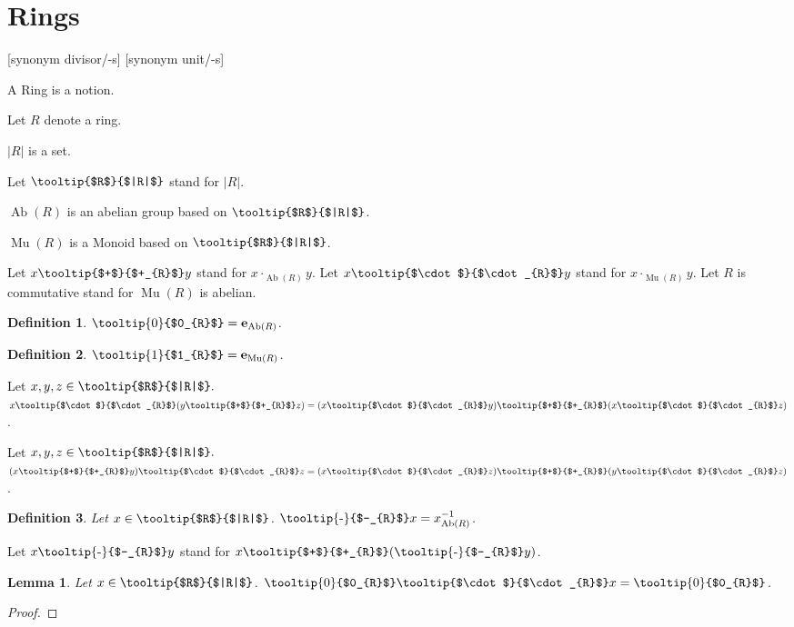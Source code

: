 \documentclass{article}
\DeclareMathOperator{\Ab}{Ab}
\DeclareMathOperator{\MuC}{Mu}
\newcommand{\gdotG}[1]{\cdot_{#1}}
\newcommand{\invC}[2]{#1^{-1}_{#2}}
\newcommand{\eC}[1]{\mathbf{e}_{#1}}
\newcommand{\sRC}[1]{\vert #1 \vert}
\newcommand{\tR}[1]{\mbox{\tooltip{$\cdot$}{$\cdot_{#1}$}}}
\newcommand{\pR}[1]{\mbox{\tooltip{$+$}{$+_{#1}$}}}
\newcommand{\sR}[1]{\mbox{\tooltip{$#1$}{$|#1|$}}}
\newcommand{\mR}[1]{\mbox{\tooltip{-}{$-_{#1}$}}}
\newcommand{\zR}[1]{\mbox{\tooltip{0}{$0_{#1}$}}}
\newcommand{\oR}[1]{\mbox{\tooltip{1}{$1_{#1}$}}}
\newtheorem*{definition}{Definition}
\newtheorem{lemma}{Lemma}
\begin{document}
\section{Rings}
\begin{forthel}
	[synonym ring/-s]
	
	[synonym divisor/-s] [synonym unit/-s]
	\begin{signature}
		A Ring is a notion.
	\end{signature}
	
	Let $R$ denote a ring.
	\begin{signature}
		$\sRC{R}$ is a set.
	\end{signature}
	Let $\sR{R}$ stand for $\sRC{R}$.
	\begin{signature}
		$\Ab(R)$ is an abelian group based on $\sR{R}$.
	\end{signature}
	
	\begin{signature}
		$\MuC(R)$ is a Monoid based on $\sR{R}$.
	\end{signature}
	
	Let $x \pR{R} y$ stand for $x \gdotG{\Ab(R)} y$.
	Let $x \tR{R} y$ stand for $x \gdotG{\MuC(R)} y$.
	Let $R$ is commutative stand for $\MuC(R)$ is abelian.
	
	\begin{definition}
		$\zR{R} = \eC{\Ab(R)}$.
	\end{definition}
	\begin{definition}
		$\oR{R} = \eC{\MuC(R)}$.
	\end{definition}
	
	\begin{axiom}[DistribI]
		Let $x,y,z \in \sR{R}.$ $x \tR{R} (y \pR{R} z) = (x \tR{R} y) \pR{R} (x \tR{R} z)$.
	\end{axiom}
	\begin{axiom}[DistribII]
		Let $x,y,z \in \sR{R}.$ $(x \pR{R} y) \tR{R} z = (x \tR{R} z) \pR{R} (y \tR{R} z)$.
	\end{axiom}
	\begin{definition}
		Let $x \in \sR{R}$. $\mR{R}x = \invC{x}{\Ab(R)}$.
	\end{definition}
	
	
	Let $x \mR{R} y$ stand for $x \pR{R} (\mR{R}y)$.
	
	
	\begin{lemma}
		Let $x \in \sR{R}$. $\zR{R} \tR{R} x = \zR{R}$.
	\end{lemma}
	\begin{proof}
		

\end{proof}
\end{forthel}
\end{document}
